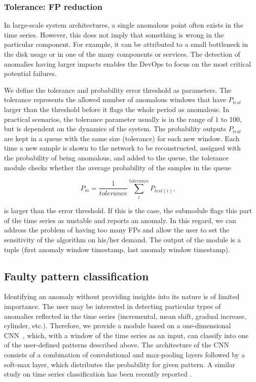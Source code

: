 \subsubsection{Tolerance: FP reduction}\label{tolerance}
In large-scale system architectures, a single anomalous point often exists in the time series. However, this does not imply that something is wrong in the particular component. For example, it can be attributed to a small bottleneck in the disk usage or in one of the many components or services. The detection of anomalies having larger impacts enables the DevOps to focus on the most critical potential failures.

We define the tolerance and probability error threshold as parameters. The tolerance represents the allowed number of anomalous windows that have $P_{test}$ larger than the threshold before it flags the whole period as anomalous. In practical scenarios, the tolerance parameter usually is in the range of 1 to 100, but is dependent on the dynamics of the system. The probability outputs $P_{test}$ are kept in a queue with the same size (tolerance) for each new window.  
Each time a new sample is shown to the network to be reconstructed, assigned with the probability of being anomalous, and added to the queue, the tolerance module checks whether the average probability of the samples in the queue

\begin{equation}\label{eqtol}
P_m=\frac{1}{tolerance}\sum_{i}^{tolerance} P_{test(i)},
\end{equation}

is larger than the error threshold. If this is the case, the submodule flags this part of the time series as unstable and reports an anomaly. 
In this regard, we can address the problem of having too many FPs and allow the user to set the sensitivity of the algorithm on his/her demand.
The output of the module is a tuple (first anomaly window timestamp, last anomaly window timestamp).

\subsection{Faulty pattern classification}

Identifying an anomaly without providing insights into its nature is of limited importance. The user may be interested in detecting particular types of anomalies reflected in the time series (incremental, mean shift, gradual increase, cylinder, etc.).  Therefore, we provide a module based on a one-dimensional CNN~\cite{lecun1995convolutional}, which, with a window of the time series as an input, can classify into one of the user-defined patterns described above. The architecture of the CNN consists of a combination of convolutional and max-pooling layers followed by a soft-max layer, which distributes the probability for given pattern. A similar study on time series classification has been recently reported \cite{zhao2017convolutional}.

